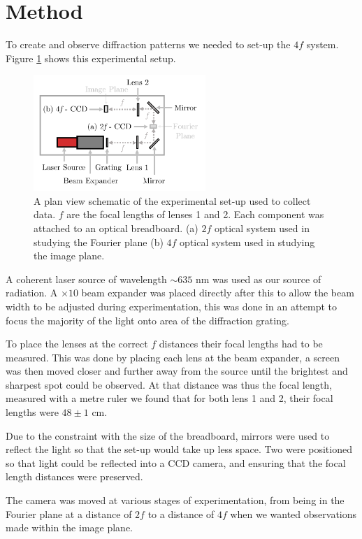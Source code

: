 \documentclass[twocolumn]{revtex4}
\begin{document}
\section{Method} 
\vspace{-2ex}
To create and observe diffraction patterns we needed to set-up the $4f$ system. Figure \ref{m-fig1} shows this experimental setup.
\begin{figure}[!h]
\begin{center}
\includegraphics[width=6.5cm]{method/fig1-1}
\caption[]{A plan view schematic of the experimental set-up used to collect data. $f$ are the focal lengths of lenses 1 and 2. Each component was attached to an optical breadboard. (a) $2f$ optical system used in studying the Fourier plane (b) $4f$ optical system used in studying the image plane.}
\label{m-fig1}
\end{center}
\end{figure}

A coherent laser source of wavelength $\sim635$ nm was used as our source of radiation. A $\times10$ beam expander was placed directly after this to allow the beam width to be adjusted during experimentation, this was done in an attempt to focus the majority of the light onto area of the diffraction grating.

To place the lenses at the correct $f$ distances their focal lengths had to be measured. This was done by placing each lens at the beam expander, a screen was then moved closer and further away from the source until the brightest and sharpest spot could be observed. At that distance was thus the focal length, measured with a metre ruler we found that for both lens 1 and 2, their focal lengths were $48\pm1$ cm.

Due to the constraint with the size of the breadboard, mirrors were used to reflect the light so that the set-up would take up less space. Two were positioned so that light could be reflected into a CCD camera, and ensuring that the focal length distances were preserved.

The camera was moved at various stages of experimentation, from being in the Fourier plane at a distance of $2f$ to a distance of $4f$ when we wanted observations made within the image plane.
\end{document}
